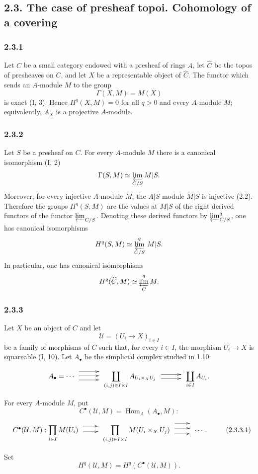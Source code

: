 \documentclass[11pt]{article}
\newcommand{\Hom}{\operatorname{Hom}}
\begin{document}
\subsection*{2.3. The case of presheaf topoi. Cohomology of a covering}

\subsubsection*{2.3.1}
Let $C$ be a small category endowed with a presheaf of rings $A$, let $\widehat C$ be the topos of presheaves on $C$, and let $X$ be a representable object of $\widehat C$. The functor which sends an $A$-module $M$ to the group
\[
\Gamma(X,M)=M(X)
\]
is exact (I, 3). Hence $H^q(X,M)=0$ for all $q>0$ and every $A$-module $M$; equivalently, $A_X$ is a projective $A$-module.

\subsubsection*{2.3.2}
Let $S$ be a presheaf on $C$. For every $A$-module $M$ there is a canonical isomorphism (I, 2)
\[
\Gamma(S,M)\simeq \varprojlim_{C/S}M|S .
\]
Moreover, for every injective $A$-module $M$, the $A|S$-module $M|S$ is injective (2.2). Therefore the groups $H^q(S,M)$ are the values at $M|S$ of the right derived functors of the functor $\varprojlim_{C/S}$. Denoting these derived functors by $\varprojlim^q_{C/S}$, one has canonical isomorphisms
\[
H^q(S,M)\simeq \varprojlim_{C/S}^q\, M|S.
\]
In particular, one has canonical isomorphisms
\[
H^q(\widehat C,M)\simeq \varprojlim_C^q M .
\]

\subsubsection*{2.3.3}
Let $X$ be an object of $C$ and let
\[
\mathcal U=(U_i\to X)_{i\in I}
\]
be a family of morphisms of $C$ such that, for every $i\in I$, the morphism $U_i\to X$ is squareable (I, 10). Let $A_\bullet$ be the simplicial complex studied in 1.10:
\[
\xymatrix@M=.25cm@C=1cm{
A_\bullet=\cdots \ar@<7pt>[r]\ar@<1pt>[r]\ar@<-5pt>[r]&
\displaystyle\coprod_{(i,j)\in I\times I} A_{U_i\times_X U_j}
\ar@<3pt>[r]\ar@<-3pt>[r]&
\displaystyle\coprod_{i\in I} A_{U_i}.
}
\]
For every $A$-module $M$, put
\[
C^\bullet(\mathcal U,M)=\Hom_A(A_\bullet,M):
\]
\[
\xymatrix@C=.75cm@M=.25cm{
C^\bullet(\mathcal U,M):
\displaystyle\prod_{i\in I} M(U_i)
\ar@<6pt>[r]\ar@<-2pt>[r]&
\displaystyle\prod_{(i,j)\in I\times I} M(U_i\times_X U_j)
\ar@<10pt>[r]\ar@<3pt>[r]\ar@<-5pt>[r]&
\cdots .
}
\tag{2.3.3.1}
\]
Set
\[
H^q(\mathcal U,M)=H^q(C^\bullet(\mathcal U,M)).
\]
\end{document}
